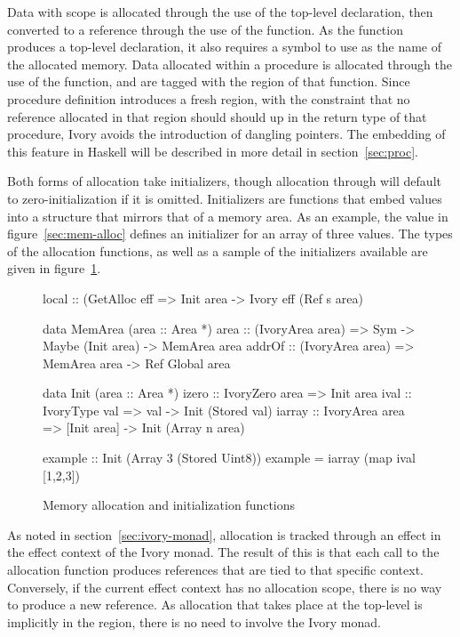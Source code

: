 Data with  scope is allocated through the use of the 
top-level declaration, then converted to a reference through the use of the
 function.  As the  function produces a top-level
declaration, it also requires a symbol to use as the name of the allocated
memory.  Data allocated within a procedure is allocated through the use of the
 function, and are tagged with the region of that function.  Since
procedure definition introduces a fresh region, with the constraint that no
reference allocated in that region should should up in the return type of that
procedure, Ivory avoids the introduction of dangling pointers.  The embedding of
this feature in Haskell will be described in more detail in
section~\ref{sec:proc}.

Both forms of allocation take initializers, though  allocation
through  will default to zero-initialization if it is omitted.
Initializers are functions that embed values into a structure that mirrors that
of a memory area.  As an example, the  value in
figure~\ref{sec:mem-alloc} defines an initializer for an array of three
 values.  The types of the allocation functions, as well as a sample
of the initializers available are given in figure~\ref{fig:mem-alloc}.

\begin{figure}
\begin{code}
local  :: (GetAlloc eff %
       => Init area -> Ivory eff (Ref s area)

data MemArea (area :: Area *)
area   :: (IvoryArea area)
       => Sym -> Maybe (Init area) -> MemArea area
addrOf :: (IvoryArea area)
       => MemArea area -> Ref Global area

data Init (area :: Area *)
izero  :: IvoryZero area => Init area
ival   :: IvoryType val  => val -> Init (Stored val)
iarray :: IvoryArea area
       => [Init area] -> Init (Array n area)

example :: Init (Array 3 (Stored Uint8))
example  = iarray (map ival [1,2,3])
\end{code}
\caption{Memory allocation and initialization functions}
\label{fig:mem-alloc}
\end{figure}

As noted in section~\ref{sec:ivory-monad}, allocation is tracked through an
effect in the effect context of the Ivory monad.  The result of this is that
each call to the  allocation function produces references that are
tied to that specific context.  Conversely, if the current effect context has
no allocation scope, there is no way to produce a new reference.  As allocation
that takes place at the top-level is implicitly in the  region, there
is no need to involve the Ivory monad.

